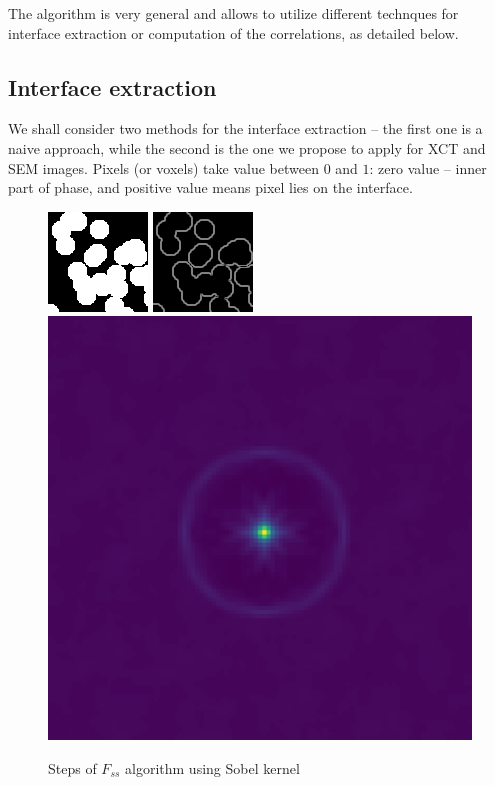 \documentclass[reprint,amsmath,amssymb,aps,pre,showkeys,showpacs]{revtex4-1}
\begin{document}
The algorithm is very general and allows to utilize different technques for
interface extraction or computation of the correlations, as detailed below.

\subsection{Interface extraction}
We shall consider two methods for the interface extraction -- the first one is a
naive approach, while the second is the one we propose to apply for XCT and SEM
images. Pixels (or voxels) take value between $0$ and $1$: zero value -- inner
part of phase, and positive value means pixel lies on the interface.

\begin{figure}
  \centering
  \includegraphics[width=0.32\linewidth]{images/original.png}
  \includegraphics[width=0.32\linewidth]{images/sobel.png}
  \includegraphics[width=0.32\linewidth]{images/Fss_map_sobel.png}
  \caption{Steps of $F_{ss}$ algorithm using Sobel kernel}
  \label{fig:stages}
\end{figure}
\end{document}
